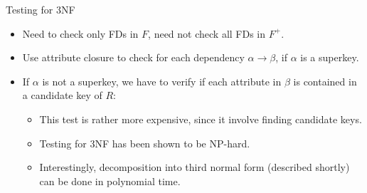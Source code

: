 \documentclass{beamer}
\begin{document}

\begin{frame}{Testing for 3NF}
    \begin{itemize}
        \item Need to check only FDs in $F$, need not check all FDs in $F^+$.
        \item Use attribute closure to check for each dependency $\alpha \rightarrow \beta$, if $\alpha$ is a superkey.
        \item If $\alpha$ is not a superkey, we have to verify if each attribute in $\beta$ is contained in a candidate key of $R$:
            \begin{itemize}
                \item This test is rather more expensive, since it involve finding candidate keys.
                \item Testing for 3NF has been shown to be NP-hard.
                \item Interestingly, decomposition into third normal form (described shortly) can be done in polynomial time.
            \end{itemize}
    \end{itemize}
\end{frame}
\end{document}
